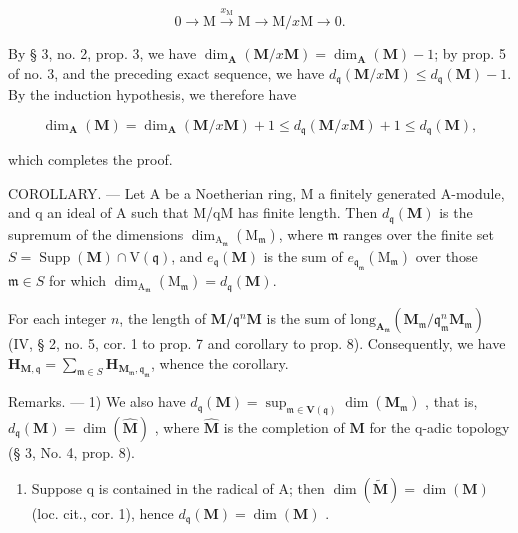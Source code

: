 \[
0 \longrightarrow \mathrm{M} \xrightarrow {x _ {\mathrm{M}}} \mathrm{M} \longrightarrow \mathrm{M} / x \mathrm{M} \longrightarrow 0.
\]

By § 3, no. 2, prop. 3, we have \(\dim_{\mathbf{A}}(\mathbf{M}/x\mathbf{M}) = \dim_{\mathbf{A}}(\mathbf{M}) - 1\); by prop. 5 of no. 3, and the preceding exact sequence, we have \(d_{\mathfrak{q}}(\mathbf{M}/x\mathbf{M}) \leqslant d_{\mathfrak{q}}(\mathbf{M}) - 1\). By the induction hypothesis, we therefore have

\[
\dim_ {\mathbf {A}} (\mathbf {M}) = \dim_ {\mathbf {A}} (\mathbf {M} / x \mathbf {M}) + 1 \leqslant d _ {\mathfrak {q}} (\mathbf {M} / x \mathbf {M}) + 1 \leqslant d _ {\mathfrak {q}} (\mathbf {M}),
\]

which completes the proof.

COROLLARY. --- Let A be a Noetherian ring, M a finitely generated A-module, and q an ideal of A such that M/qM has finite length. Then \(d_{\mathfrak{q}}(\mathbf{M})\) is the supremum of the dimensions \(\dim_{\mathrm{A}_{\mathfrak{m}}}\left(\mathrm{M}_{\mathfrak{m}}\right)\), where \(\mathfrak{m}\) ranges over the finite set \(S = \operatorname{Supp}(\mathbf{M}) \cap \mathrm{V}(\mathfrak{q})\), and \(e_{\mathfrak{q}}(\mathbf{M})\) is the sum of \(e_{\mathfrak{q}_{\mathfrak{m}}}\left(\mathrm{M}_{\mathfrak{m}}\right)\) over those \(\mathfrak{m}\in S\) for which \(\dim_{\mathrm{A}_{\mathfrak{m}}}\left(\mathrm{M}_{\mathfrak{m}}\right) = d_{\mathfrak{q}}(\mathbf{M})\).

For each integer \(n\), the length of \(\mathbf{M} / \mathfrak{q}^n\mathbf{M}\) is the sum of \(\mathrm{long}_{\mathbf{A}_{\mathfrak{m}}}(\mathbf{M}_{\mathfrak{m}} / \mathfrak{q}_{\mathfrak{m}}^n\mathbf{M}_{\mathfrak{m}})\) (IV, § 2, no. 5, cor. 1 to prop. 7 and corollary to prop. 8). Consequently, we have \(\mathbf{H}_{\mathbf{M},\mathfrak{q}} = \sum_{\mathfrak{m}\in S}\mathbf{H}_{\mathbf{M}_{\mathfrak{m}},\mathfrak{q}_{\mathfrak{m}}}\), whence the corollary.

Remarks. --- 1) We also have \(d_{\mathfrak{q}}(\mathbf{M}) = \sup_{\mathfrak{m} \in \mathbf{V}(\mathfrak{q})} \dim(\mathbf{M}_{\mathfrak{m}})\) , that is, \(d_{\mathfrak{q}}(\mathbf{M}) = \dim(\hat{\mathbf{M}})\) , where \(\hat{\mathbf{M}}\) is the completion of \(\mathbf{M}\) for the q-adic topology (§ 3, No. 4, prop. 8).

\begin{enumerate}
\def\labelenumi{\arabic{enumi})}
\setcounter{enumi}{1}
\tightlist
\item
  Suppose q is contained in the radical of A; then \(\dim(\tilde{\mathbf{M}})=\dim(\mathbf{M})\) (loc. cit., cor. 1), hence \(d_{\mathfrak{q}}(\mathbf{M})=\dim(\mathbf{M})\) .
\end{enumerate}

